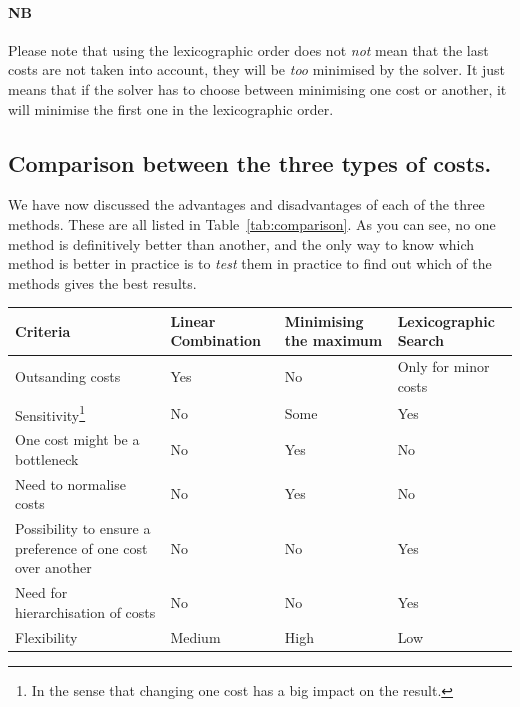 \paragraph{NB} Please note that using the lexicographic order does not \textit{not} mean that the last costs are not taken into account, they will be \textit{too} minimised by the solver. It just means that if the solver has to choose between minimising one cost or another, it will minimise the first one in the lexicographic order. 

\subsection{Comparison between the three types of costs.}

We have now discussed the advantages and disadvantages of each of the three methods. These are all listed in Table~\ref{tab:comparison}. As you can see, no one method is definitively better than another, and the only way to know which method is better in practice is to \textit{test} them in practice to find out which of the methods gives the best results. 
\newpage
\begin{center}
    \centering
    \label{tab:comparison}
    \begin{tabularx}{\textwidth}{|>{\centering\arraybackslash}p{4cm}|>{\centering\arraybackslash}X|>{\centering\arraybackslash}X|>{\centering\arraybackslash}X|}
        \hline
        \textbf{Criteria} & \textbf{Linear Combination} & \textbf{Minimising the maximum} & \textbf{Lexicographic Search} \\
        \hline
        Outsanding costs & \cellcolor{red!25}Yes & \cellcolor{green!25}No & \cellcolor{orange!25}Only for minor costs \\
        \hline
        Sensitivity\footnote{In the sense that changing one cost has a big impact on the result.} & \cellcolor{red!25}No & \cellcolor{orange!25}Some & \cellcolor{green!25}Yes \\
        \hline
        One cost might be a bottleneck & \cellcolor{green!25}No & \cellcolor{red!25}Yes & \cellcolor{green!25}No \\
        \hline
        Need to normalise costs& \cellcolor{green!25}No & \cellcolor{red!25}Yes & \cellcolor{green!25}No \\
        \hline
        Possibility to ensure a preference of one cost over another  & \cellcolor{red!25}No & \cellcolor{red!25}No & \cellcolor{green!25}Yes \\
        \hline
        Need for hierarchisation of costs & \cellcolor{green!25}No & \cellcolor{green!25}No & \cellcolor{red!25}Yes \\
        \hline
        Flexibility & \cellcolor{orange!25}Medium & \cellcolor{green!25}High & \cellcolor{red!25}Low \\
        \hline

    \end{tabularx}
\end{center}

